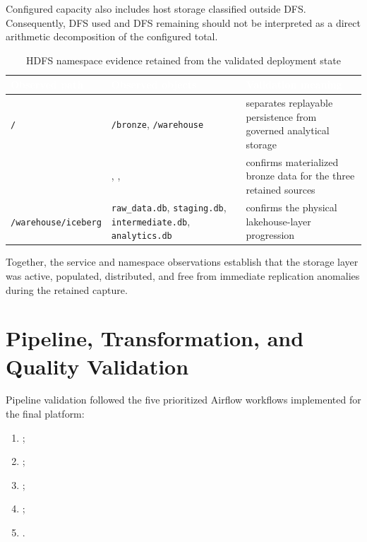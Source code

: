 Configured capacity also includes host storage classified outside DFS. Consequently, DFS used and DFS remaining should not be interpreted as a direct arithmetic decomposition of the configured total.

\begin{table}[!htbp]
    \centering
    \footnotesize
    \renewcommand{\arraystretch}{1.14}
    \begin{tabularx}{\textwidth}{|L{0.29\textwidth}|L{0.31\textwidth}|Y|}
        \hline
        \textcolor{white}{\textbf{Observed path}} & \textcolor{white}{\textbf{Observed objects}} & \textcolor{white}{\textbf{Validation meaning}} \\
        \hline
        \texttt{/} & \texttt{/bronze}, \texttt{/warehouse} & separates replayable persistence from governed analytical storage \\
        \hline
         & , ,  & confirms materialized bronze data for the three retained sources \\
        \hline
        \texttt{/warehouse/iceberg} & \texttt{raw\_data.db}, \texttt{staging.db}, \texttt{intermediate.db}, \texttt{analytics.db} & confirms the physical lakehouse-layer progression \\
        \hline
    \end{tabularx}
    \caption{HDFS namespace evidence retained from the validated deployment state}
    \label{tab:chapter8-hdfs-namespace-evidence}
\end{table}

Together, the service and namespace observations establish that the storage layer was active, populated, distributed, and free from immediate replication anomalies during the retained capture.
\FloatBarrier

\section{Pipeline, Transformation, and Quality Validation}
Pipeline validation followed the five prioritized Airflow workflows implemented for the final platform:
\begin{enumerate}
    \item {};
    \item {};
    \item {};
    \item {};
    \item {}.
\end{enumerate}

